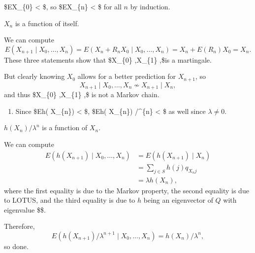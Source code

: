 \documentclass[
  letterpaper,
  DIV=11,
  numbers=noendperiod]{scrreprt}
\providecommand{\tightlist}{%
  \setlength{\itemsep}{0pt}\setlength{\parskip}{0pt}}\usepackage{longtable,booktabs,array}
\theoremstyle{definition}
\theoremstyle{plain}
\theoremstyle{remark}
\begin{document}
\begin{tcolorbox}[enhanced jigsaw, bottomrule=.15mm, opacityback=0, arc=.35mm, breakable, left=2mm, colframe=quarto-callout-tip-color-frame, toprule=.15mm, rightrule=.15mm, leftrule=.75mm, colback=white]
\begin{minipage}[t]{\textwidth - 5.5mm}
\$\displaystyle E\textbar X\_\{0\} \textbar\textless{} \infty \$, so
\$\displaystyle E\textbar X\_\{n\} \textbar\textless{} \infty \$ for all
\(\displaystyle n\) by induction.

\(\displaystyle X_{n}\) is a function of itself.

We can compute \[
\begin{equation*}
E( X_{n+1} \mid X_{0} ,\dotsc ,X_{n}) =E( X_{n} +R_{n} X_{0} \mid X_{0} ,\dotsc ,X_{n}) =X_{n} +E( R_{n}) X_{0} =X_{n} .
\end{equation*}
\] These three statements show that \$\displaystyle X\_\{0\} ,X\_\{1\}
,\dotsc \$is a martingale.

But clearly knowing \(\displaystyle X_{0}\) allows for a better
prediction for \(\displaystyle X_{n+1}\), so \[
\begin{equation*}
X_{n+1} \mid X_{0} ,\dotsc ,X_{n} \nsim X_{n+1} \mid X_{n} ,
\end{equation*}
\] and thus \$\displaystyle X\_\{0\} ,X\_\{1\} ,\dotsc \$ is not a
Markov chain.

\begin{enumerate}
\def\labelenumi{(\alph{enumi})}
\setcounter{enumi}{2}
\tightlist
\item
  Since \$\displaystyle E\textbar h( X\_\{n\}) \textbar\textless{}
  \infty \$, \$\displaystyle E\textbar h( X\_\{n\}) /\lambda \^{}\{n\}
  \textbar\textless{} \infty \$ as well since
  \(\displaystyle \lambda \neq 0\).
\end{enumerate}

\(\displaystyle h( X_{n}) /\lambda ^{n}\) is a function of
\(\displaystyle X_{n}\).

We can compute \[
\begin{align*}
E( h( X_{n+1}) \mid X_{0} ,\dotsc ,X_{n}) & =E( h( X_{n+1}) \mid X_{n})\\
 & =\sum _{j\in S} h( j) q_{X_{n} j}\\
 & =\lambda h( X_{n}) ,
\end{align*}
\] where the first equality is due to the Markov property, the second
equality is due to LOTUS, and the third equality is due to
\(\displaystyle h\) being an eigenvector of \(\displaystyle Q\) with
eigenvalue \$\displaystyle \lambda \$.

Therefore, \[
\begin{equation*}
E\left( h( X_{n+1}) /\lambda ^{n+1} \mid X_{0} ,\dotsc ,X_{n}\right) =h( X_{n}) /\lambda ^{n} ,
\end{equation*}
\] so done.

\end{minipage}%
\end{tcolorbox}
\end{document}
